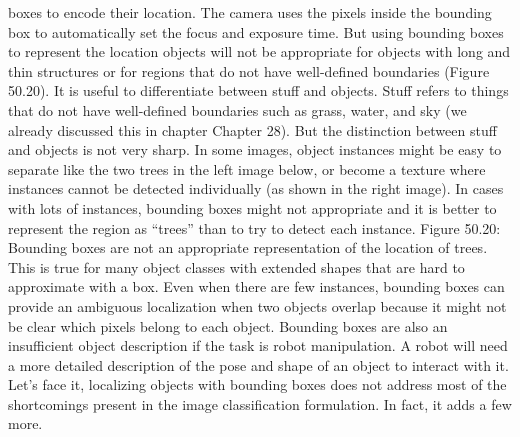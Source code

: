 boxes to encode their location. The camera uses the pixels inside the bounding box to automatically set the focus and exposure time. But using bounding boxes to represent the location objects will not be appropriate for objects with long and thin structures or for regions that do not have well-defined boundaries (Figure 50.20). It is useful to differentiate between stuff and objects. Stuff refers to things that do not have well-defined boundaries such as grass, water, and sky (we already discussed this in chapter Chapter 28). But the distinction between stuff and objects is not very sharp. In some images, object instances might be easy to separate like the two trees in the left image below, or become a texture where instances cannot be detected individually (as shown in the right image). In cases with lots of instances, bounding boxes might not appropriate and it is better to represent the region as “trees” than to try to detect each instance. Figure 50.20: Bounding boxes are not an appropriate representation of the location of trees. This is true for many object classes with extended shapes that are hard to approximate with a box. Even when there are few instances, bounding boxes can provide an ambiguous localization when two objects overlap because it might not be clear which pixels belong to each object. Bounding boxes are also an insufficient object description if the task is robot manipulation. A robot will need a more detailed description of the pose and shape of an object to interact with it. Let’s face it, localizing objects with bounding boxes does not address most of the shortcomings present in the image classification formulation. In fact, it adds a few more.
